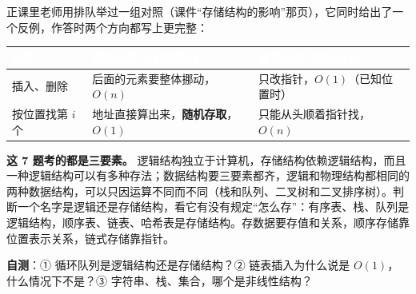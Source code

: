 \documentclass[10.5pt,a4paper,oneside]{article}
\newcommand{\hlred}[1]{\textcolor{wdred}{\bfseries #1}}
\begin{document}
\begin{recallbox}

正课里老师用排队举过一组对照（课件“存储结构的影响”那页），它同时给出了一个反例，作答时两个方向都写上更完整：

{
\begin{xltabular}{\linewidth}{>{\hsize\raggedright\arraybackslash}X>{\hsize\raggedright\arraybackslash}X>{\hsize\raggedright\arraybackslash}X}
\textcolor{white}{\bfseries 运算} & \textcolor{white}{\bfseries 顺序存储（传统排队）} & \textcolor{white}{\bfseries 链式存储（银行取号）} \\
\endfirsthead
插入、删除 & 后面的元素要整体挪动，\(O(n)\) & 只改指针，\(O(1)\)（已知位置时） \\ \hline
按位置找第 \(i\) 个 & 地址直接算出来，\hlred{随机存取}，\(O(1)\) & 只能从头顺着指针找，\(O(n)\) \\ \hline
\end{xltabular}\par\vspace{4pt}}

\end{recallbox}

\begin{summarybox}

\textbf{这 7 题考的都是三要素。}
逻辑结构独立于计算机，存储结构依赖逻辑结构，而且一种逻辑结构可以有多种存法；数据结构要三要素都齐，逻辑和物理结构都相同的两种数据结构，可以只因运算不同而不同（栈和队列、二叉树和二叉排序树）。判断一个名字是逻辑还是存储结构，看它有没有规定“怎么存”：有序表、栈、队列是逻辑结构，顺序表、链表、哈希表是存储结构。存数据要存值和关系，顺序存储靠位置表示关系，链式存储靠指针。

\textbf{自测}：① 循环队列是逻辑结构还是存储结构？② 链表插入为什么说是
\(O(1)\)，什么情况下不是？③ 字符串、栈、集合，哪个是非线性结构？

\end{summarybox}
\end{document}
